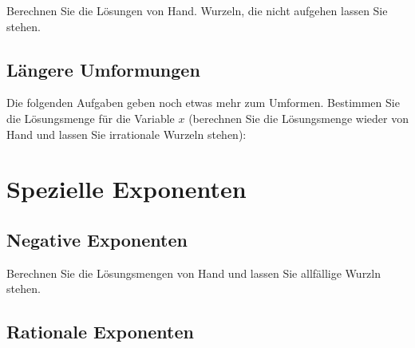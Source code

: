 Berechnen Sie die Lösungen von Hand. Wurzeln, die nicht aufgehen
lassen Sie stehen.





\noTRAINER{\newpage}

\subsection{Längere Umformungen}
Die folgenden Aufgaben geben noch etwas mehr zum Umformen. Bestimmen
Sie die Lösungsmenge für die Variable $x$ (berechnen Sie die
Lösungsmenge wieder von Hand und lassen Sie irrationale Wurzeln stehen):




\newpage
\section{Spezielle Exponenten}
\subsection{Negative Exponenten}

Berechnen Sie die Lösungsmengen von Hand und lassen Sie allfällige
Wurzln stehen.


\noTRAINER{\newpage}
\subsection{Rationale Exponenten}




